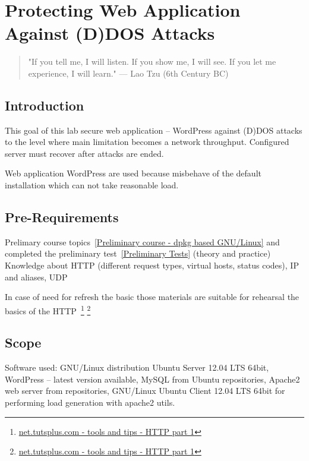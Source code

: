 

\chapter{Protecting Web Application Against (D)DOS Attacks}
\label{Protecting Web Application Against (D)DOS Attacks}

 
\begin{quote}
"If you tell me, I will listen. If you show me, I
will see. If you let me experience, I will learn." --- Lao Tzu (6th Century BC)
\end{quote}

\section{Introduction}
This goal of this lab secure web application -- WordPress against (D)DOS attacks to the level where main limitation becomes a network throughput. Configured server must recover after attacks are ended.

Web application WordPress are used because misbehave of the default installation which can not take reasonable load.

\section{Pre-Requirements}
Prelimary course topics~\ref{Preliminary course - dpkg based GNU/Linux} and completed the preliminary test~\ref{Preliminary Tests} (theory and practice)
Knowledge about \gls{HTTP} (different request types, virtual hosts, status codes), \gls{IP} and aliases, \gls{UDP}

In case of need for refresh the basic those materials are suitable for rehearsal the basics of the \gls{HTTP}~\footnote{
\href{http://net.tutsplus.com/tutorials/tools-and-tips/http-the-protocol-every-web-developer-must-know-part-1/}{net.tutsplus.com - tools and tips - HTTP part 1}} \footnote{
\href{http://net.tutsplus.com/tutorials/tools-and-tips/http-the-protocol-every-web-developer-must-know-part-2/}{net.tutsplus.com - tools and tips - HTTP part 1}}
\section{Scope}
Software used:  GNU/Linux distribution Ubuntu Server 12.04 LTS 64bit, WordPress -- latest version available, MySQL from Ubuntu repositories, Apache2 web server from repositories, GNU/Linux Ubuntu Client 12.04 LTS 64bit for performing load generation with apache2 utils.

